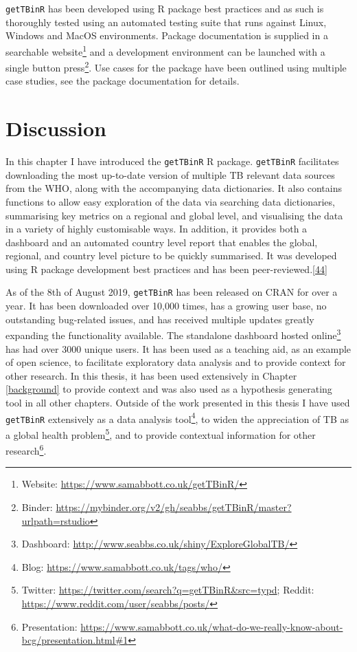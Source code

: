 \documentclass[11pt,twoside]{bristolthesis}
\begin{document}
  \texttt{getTBinR} has been developed using R package best practices and as such is thoroughly tested using an automated testing suite that runs against Linux, Windows and MacOS environments. Package documentation is supplied in a searchable website\footnote{Website: \url{https://www.samabbott.co.uk/getTBinR/}} and a development environment can be launched with a single button press\footnote{Binder: \url{https://mybinder.org/v2/gh/seabbs/getTBinR/master?urlpath=rstudio}}. Use cases for the package have been outlined using multiple case studies, see the package documentation for details.
  
  \hypertarget{discussion}{%
  \section{Discussion}\label{discussion}}
  
  In this chapter I have introduced the \texttt{getTBinR} R package. \texttt{getTBinR} facilitates downloading the most up-to-date version of multiple TB relevant data sources from the WHO, along with the accompanying data dictionaries. It also contains functions to allow easy exploration of the data via searching data dictionaries, summarising key metrics on a regional and global level, and visualising the data in a variety of highly customisable ways. In addition, it provides both a dashboard and an automated country level report that enables the global, regional, and country level picture to be quickly summarised. It was developed using R package development best practices and has been peer-reviewed.{[}\protect\hyperlink{ref-Abbott:2018}{44}{]}
  
  As of the 8th of August 2019, \texttt{getTBinR} has been released on CRAN for over a year. It has been downloaded over 10,000 times, has a growing user base, no outstanding bug-related issues, and has received multiple updates greatly expanding the functionality available. The standalone dashboard hosted online\footnote{Dashboard: \url{http://www.seabbs.co.uk/shiny/ExploreGlobalTB/}} has had over 3000 unique users. It has been used as a teaching aid, as an example of open science, to facilitate exploratory data analysis and to provide context for other research. In this thesis, it has been used extensively in Chapter \ref{background} to provide context and was also used as a hypothesis generating tool in all other chapters. Outside of the work presented in this thesis I have used \texttt{getTBinR} extensively as a data analysis tool\footnote{Blog: \url{https://www.samabbott.co.uk/tags/who/}}, to widen the appreciation of TB as a global health problem\footnote{Twitter: \url{https://twitter.com/search?q=getTBinR\&src=typd}; Reddit: \url{https://www.reddit.com/user/seabbs/posts/}}, and to provide contextual information for other research\footnote{Presentation: \url{https://www.samabbott.co.uk/what-do-we-really-know-about-bcg/presentation.html\#1}}.
  
\end{document}
